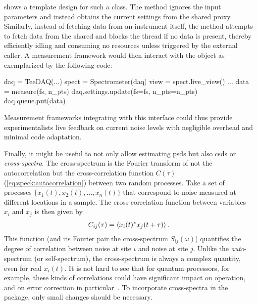  shows a template design for such a  class.
The  method ignores the input parameters and instead obtains the current settings from the shared  proxy.
Similarly, instead of fetching data from an instrument itself, the  method attempts to fetch data from the shared  and blocks the thread if no data is present, thereby efficiently idling and consuming no resources unless triggered by the external caller.
A measurement framework would then interact with the  object as exemplarized by the following code:
\begin{pycode}
    daq = TeeDAQ(...)
    spect = Spectrometer(daq)
    view = spect.live_view()
    ...
    data = measure(fs, n_pts)
    daq.settings.update(fs=fs, n_pts=n_pts)
    daq.queue.put(data)
\end{pycode}
Measurement frameworks integrating with this interface could thus provide experimentalists live feedback on current noise levels with negligible overhead and minimal code adaptation.

Finally, it might be useful to not only allow estimating \glspl{psd} but also \glspl{csd} or \emph{cross-spectra}.
The cross-spectrum
is the Fourier transform of not the autocorrelation but the cross-correlation function $C(\tau)$ (\cref{eq:speck:autocorrelation}) between two random processes.
Take a set of processes $\{x_1(t), \allowbreak x_2(t), \allowbreak \dotsc, \allowbreak x_n(t)\}$ that correspond to noise measured at different locations in a sample.
The cross-correlation function between variables $x_i$ and $x_j$ is then given by
\begin{align}\label{eq:speck:conclusion:crosscorrelation}
    C_{ij}(\tau) = \expval{x_i(t)\conjugate x_j(t + \tau)}.
\end{align}
This function (and its Fourier pair the cross-spectrum $S_{ij}(\omega)$) quantifies the degree of correlation between noise at site $i$ and noise at site $j$.
Unlike the \emph{auto}-spectrum (or self-spectrum), the cross-spectrum is always a complex quantity, even for real $x_i(t)$.
It is not hard to see that for quantum processors, for example, these kinds of correlations could have significant impact on operation, and on error correction in particular~\cite{Aharonov2006,Nickerson2019,Clader2021}.
To incorporate cross-spectra in the \pyspeck package, only small changes should be necessary.

